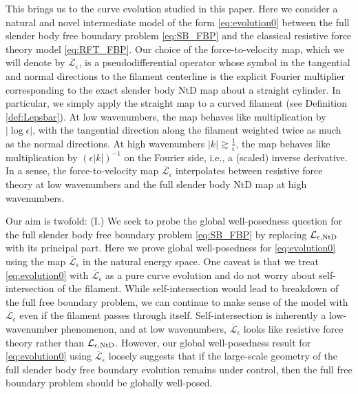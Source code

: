 \documentclass[11pt,reqno]{amsart}
\newcommand{\abs}[1]{\left\lvert #1 \right\rvert}
\newcommand{\mc}[1]{\mathcal{#1}}
\numberwithin{equation}{section}
\theoremstyle{definition}
\begin{document}
This brings us to the curve evolution studied in this paper. Here we consider a natural and novel intermediate model of the form \eqref{eq:evolution0} between the full slender body free boundary problem \eqref{eq:SB_FBP} and the classical resistive force theory model \eqref{eq:RFT_FBP}. Our choice of the force-to-velocity map, which we will denote by $\overline{\mc{L}}_\epsilon$, is a pseudodifferential operator whose symbol in the tangential and normal directions to the filament centerline is the explicit Fourier multiplier corresponding to the exact slender body NtD map about a straight cylinder. In particular, we simply apply the straight map to a curved filament (see Definition \ref{def:Lepsbar}). At low wavenumbers, the map behaves like multiplication by $\abs{\log\epsilon}$, with the tangential direction along the filament weighted twice as much as the normal directions. At high wavenumbers $|k|\gtrsim \frac{1}{\epsilon}$, the map behaves like multiplication by $(\epsilon\abs{k})^{-1}$ on the Fourier side, i.e., a (scaled) inverse derivative.
In a sense, the force-to-velocity map $\overline{{\mc L}}_\epsilon$ interpolates between resistive force theory at low wavenumbers and the full slender body NtD map at high wavenumbers. 




Our aim is twofold: 
(I.) We seek to probe the global well-posedness question for the full slender body free boundary problem \eqref{eq:SB_FBP} by replacing $\mc{L}_{\epsilon,\rm NtD}$ with its principal part. Here we prove global well-posedness for \eqref{eq:evolution0} using the map $\overline{\mc{L}}_\epsilon$ in the natural energy space. One caveat is that we treat \eqref{eq:evolution0} with $\overline{\mc{L}}_\epsilon$ as a pure curve evolution and do not worry about self-intersection of the filament. While self-intersection would lead to breakdown of the full free boundary problem, we can continue to make sense of the model with $\overline{\mc{L}}_\epsilon$ even if the filament passes through itself. Self-intersection is inherently a low-wavenumber phenomenon, and at low wavenumbers, $\overline{\mc{L}}_\epsilon$ looks like resistive force theory rather than $\mc{L}_{\epsilon,\rm NtD}$. However, our global well-posedness result for \eqref{eq:evolution0} using $\overline{\mc{L}}_\epsilon$ loosely suggests that if the large-scale geometry of the full slender body free boundary evolution remains under control, then the full free boundary problem should be globally well-posed.
\end{document}
